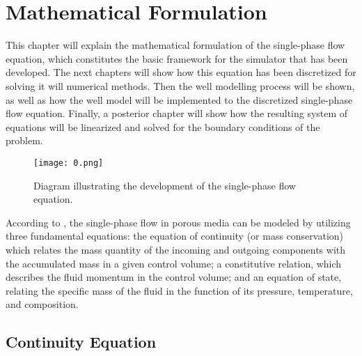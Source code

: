 \chapter{Mathematical Formulation}

\label{mathematicalFormulation}
 
  This chapter will explain the mathematical formulation of the single-phase flow equation, which constitutes the basic framework for the simulator that has been developed. The next chapters will show how this equation has been discretized for solving it will numerical methods. Then the well modelling process will be shown, as well as how the well model will be implemented to the discretized single-phase flow equation. Finally, a posterior chapter will show how the resulting system of equations will be linearized and solved for the boundary conditions of the problem.
  \begin{figure}[H]
  	\centering
  	\texttt{[image: 0.png]}\\
  	\caption{Diagram illustrating the development of the single-phase flow equation.}
  	\label{fig:0}
  \end{figure}

  According to \cite{Ertekin2001}, the single-phase flow in porous media can be modeled by utilizing three fundamental equations: the equation of continuity (or mass conservation) which relates the mass quantity of the incoming and outgoing components with the accumulated mass in a given control volume; a constitutive relation, which describes the fluid momentum in the control volume; and an equation of state, relating the specific mass of the fluid in the function of its pressure, temperature, and composition.
  
\section{Continuity Equation}

